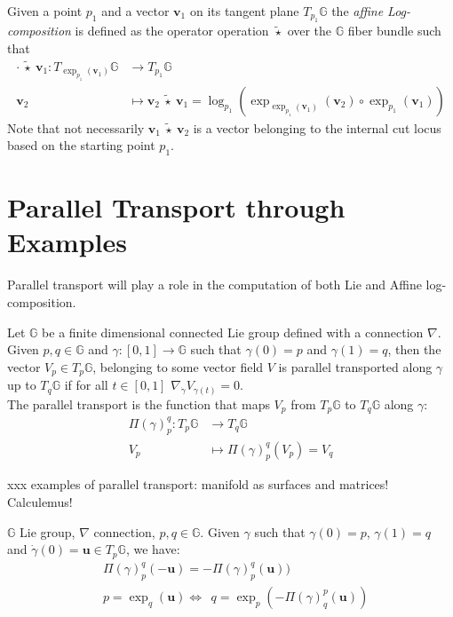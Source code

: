 Given a point $p_1$ and a vector $\mathbf{v}_{1}$ on its tangent plane $T_{p_1}\mathbb{G}$ the \emph{affine Log-composition} is defined as the operator operation $\tilde{\star} $ over the $\mathbb{G}$ fiber bundle such that 
\begin{align*}
\cdot ~ \tilde{\star} ~ \mathbf{v}_{1}  : T_{\exp_{p_1}(\mathbf{v}_{1})}\mathbb{G}  & \longrightarrow T_{p_1}\mathbb{G}   
\\
\mathbf{v}_{2}&\longmapsto \mathbf{v}_{2}~\tilde{\star}~ \mathbf{v}_{1}
=
\log_{p_1}(\exp_{\exp_{p_1}(\mathbf{v}_{1})}(\mathbf{v}_{2})\circ\exp_{p_1}(\mathbf{v}_{1}))
\end{align*}
Note that not necessarily $\mathbf{v}_{1}~\tilde{\star}~ \mathbf{v}_{2}$ is a vector belonging to the internal cut locus based on the starting point $p_{1}$.

\section{Parallel Transport through Examples}
Parallel transport will play a role in the computation of both Lie and Affine log-composition.
\begin{definition}
	Let $\mathbb{G}$ be a finite dimensional connected Lie group defined with a connection $\nabla$. Given $p,q \in \mathbb{G}$ and $\gamma : [0,1] \rightarrow \mathbb{G}$ such that $\gamma(0) = p$ and $\gamma(1) = q$, then the vector $V_{p} \in T_{p}\mathbb{G}$, belonging to some vector field $V$ is parallel transported along $\gamma$ up to $T_{q}\mathbb{G}$ if for all $t \in  [0,1]$ $\nabla_{\dot{\gamma}}V_{\gamma(t)} = 0$.\\
	The parallel transport is the function that maps $V_{p}$ from $T_{p}\mathbb{G}$ to $T_{q}\mathbb{G}$ along $\gamma$:
	\begin{align*}
		\Pi(\gamma)_{p}^{q} :  T_{p}\mathbb{G} & \longrightarrow T_{q}\mathbb{G}  \\
		V_{p}&\longmapsto \Pi(\gamma)_{p}^{q}(V_{p}) = V_{q}
	\end{align*}
\end{definition}

\noindent
xxx examples of parallel transport: manifold as surfaces and matrices! Calculemus!

\begin{prop}[Inversion]
	$\mathbb{G}$ Lie group, $\nabla$ connection, $p,q\in\mathbb{G}$. Given $\gamma$ such that $\gamma(0)= p$, $\gamma(1)=q$ and $\dot{\gamma}(0)=\mathbf{u}\in T_{p}\mathbb{G}$, we have:
	\begin{align}
& \Pi(\gamma)_{p}^{q}(-\mathbf{u}) = -\Pi(\gamma)_{p}^{q}(\mathbf{u}) )\\
& p = \exp_{q}(\mathbf{u}) \Longleftrightarrow \phantom{z} q = \exp_{p}(-\Pi(\gamma)_{q}^{p}(\mathbf{u}))
	\end{align}
\end{prop}

